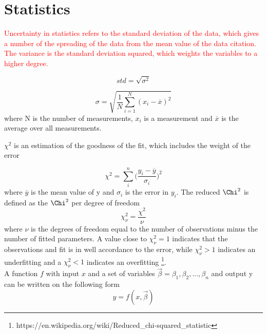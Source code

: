 
\chapter{Statistics} \label{ch_app:statistics}

\noindent \textcolor{red}{Uncertainty in statistics refers to the standard deviation of the data, which gives a number of the spreading of the data from the mean value of the data \textcolor{red}{citation}. The variance is the standard deviation squared, which weights the variables to a higher degree. }

\begin{equation}
    std = \sqrt{\sigma^2}
\end{equation}

\begin{equation} \label{eq:standard_dev}
    \sigma = \sqrt{\frac{1}{N}\sum_{i=1}^N (x_i - \overline{x})^2}
\end{equation}
\noindent
where N is the number of measurements, $x_i$ is a measurement and $\overline{x}$ is the average over all measurements. 

$\chi^2$ is an estimation of the goodness of the fit, which includes the weight of the error

\begin{equation} \label{eq:chisq}
    \chi^2 = \sum_i^n \Big( \frac{y_i - \overline{y}}{\sigma_i} \Big)^2
\end{equation}
where $\overline{y}$ is the mean value of y and $\sigma_i$ is the error in $y_i$. The reduced $\Chi^2$ is defined as the $\Chi^2$ per degree of freedom 
\begin{equation} \label{eq:chisq_DOF}
    \chi^2_\nu = \frac{\chi^2}{\nu}
\end{equation}
where $\nu$ is the degrees of freedom equal to the number of observations minus the number of fitted parameters. A value close to $\chi^2_\nu=1$ indicates that the observations and fit is in well accordance to the error, while $\chi^2_\nu>1$ indicates an underfitting and a $\chi^2_\nu<1$ indicates an overfitting \footnote{https://en.wikipedia.org/wiki/Reduced_chi-squared_statistic}. \\

\noindent 
A function $f$ with input $x$ and a set of variables $\vec{\beta}= \beta_1, \beta_2, ..., \beta_n$ and output y can be written on the following form
\begin{equation}
    y = f(x, \vec{\beta})
\end{equation}

